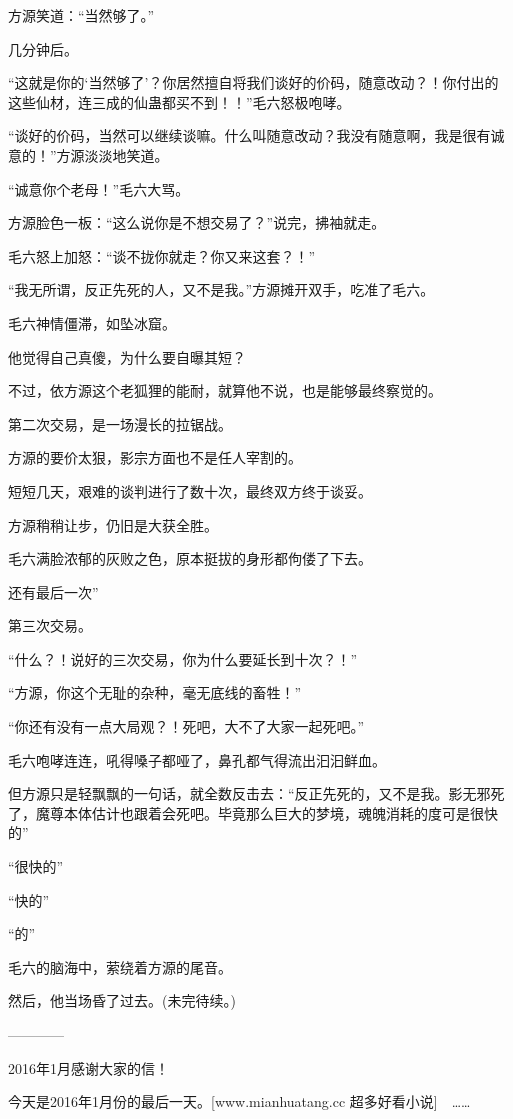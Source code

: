 \begin{this_body}
方源笑道：“当然够了。”

几分钟后。

“这就是你的‘当然够了’？你居然擅自将我们谈好的价码，随意改动？！你付出的这些仙材，连三成的仙蛊都买不到！！”毛六怒极咆哮。

“谈好的价码，当然可以继续谈嘛。什么叫随意改动？我没有随意啊，我是很有诚意的！”方源淡淡地笑道。

“诚意你个老母！”毛六大骂。

方源脸色一板：“这么说你是不想交易了？”说完，拂袖就走。

毛六怒上加怒：“谈不拢你就走？你又来这套？！”

“我无所谓，反正先死的人，又不是我。”方源摊开双手，吃准了毛六。

毛六神情僵滞，如坠冰窟。

他觉得自己真傻，为什么要自曝其短？

不过，依方源这个老狐狸的能耐，就算他不说，也是能够最终察觉的。

第二次交易，是一场漫长的拉锯战。

方源的要价太狠，影宗方面也不是任人宰割的。

短短几天，艰难的谈判进行了数十次，最终双方终于谈妥。

方源稍稍让步，仍旧是大获全胜。

毛六满脸浓郁的灰败之色，原本挺拔的身形都佝偻了下去。

还有最后一次”

第三次交易。

“什么？！说好的三次交易，你为什么要延长到十次？！”

“方源，你这个无耻的杂种，毫无底线的畜牲！”

“你还有没有一点大局观？！死吧，大不了大家一起死吧。”

毛六咆哮连连，吼得嗓子都哑了，鼻孔都气得流出汩汩鲜血。

但方源只是轻飘飘的一句话，就全数反击去：“反正先死的，又不是我。影无邪死了，魔尊本体估计也跟着会死吧。毕竟那么巨大的梦境，魂魄消耗的度可是很快的”

“很快的”

“快的”

“的”

毛六的脑海中，萦绕着方源的尾音。

然后，他当场昏了过去。(未完待续。)

------------

2016年1月感谢大家的信！

今天是2016年1月份的最后一天。[www.mianhuatang.cc 超多好看小说]　……


\end{this_body}
